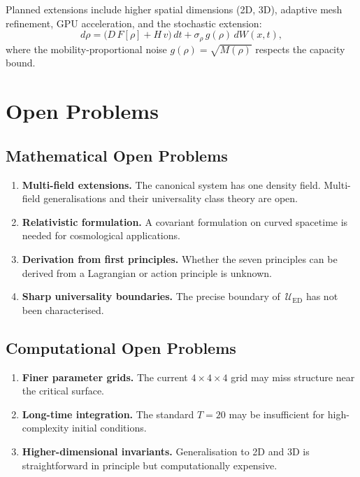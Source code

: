 \documentclass[11pt,twoside,openright]{book}
\theoremstyle{definition}
\theoremstyle{plain}
\theoremstyle{definition}
\theoremstyle{remark}
\newcommand{\Fop}{F[\rho]}
\newcommand{\UED}{\mathcal{U}_{\mathrm{ED}}}
\begin{document}
Planned extensions include higher spatial dimensions (2D, 3D), adaptive mesh refinement, GPU acceleration, and the stochastic extension:
\begin{equation}\label{eq:stochastic}
d\rho = \bigl(D\,\Fop + H\,v\bigr)\,dt + \sigma_\rho\,g(\rho)\,dW(x,t),
\end{equation}
where the mobility-proportional noise \(g(\rho) = \sqrt{M(\rho)}\) respects the capacity bound.


\chapter{Open Problems}\label{ch:open}

\section{Mathematical Open Problems}

\begin{enumerate}
\item \textbf{Multi-field extensions.} The canonical system has one density field. Multi-field generalisations and their universality class theory are open.
\item \textbf{Relativistic formulation.} A covariant formulation on curved spacetime is needed for cosmological applications.
\item \textbf{Derivation from first principles.} Whether the seven principles can be derived from a Lagrangian or action principle is unknown.
\item \textbf{Sharp universality boundaries.} The precise boundary of~\(\UED\) has not been characterised.
\end{enumerate}

\section{Computational Open Problems}

\begin{enumerate}[resume]
\item \textbf{Finer parameter grids.} The current \(4 \times 4 \times 4\) grid may miss structure near the critical surface.
\item \textbf{Long-time integration.} The standard \(T = 20\) may be insufficient for high-complexity initial conditions.
\item \textbf{Higher-dimensional invariants.} Generalisation to 2D and 3D is straightforward in principle but computationally expensive.
\end{enumerate}
\end{document}
